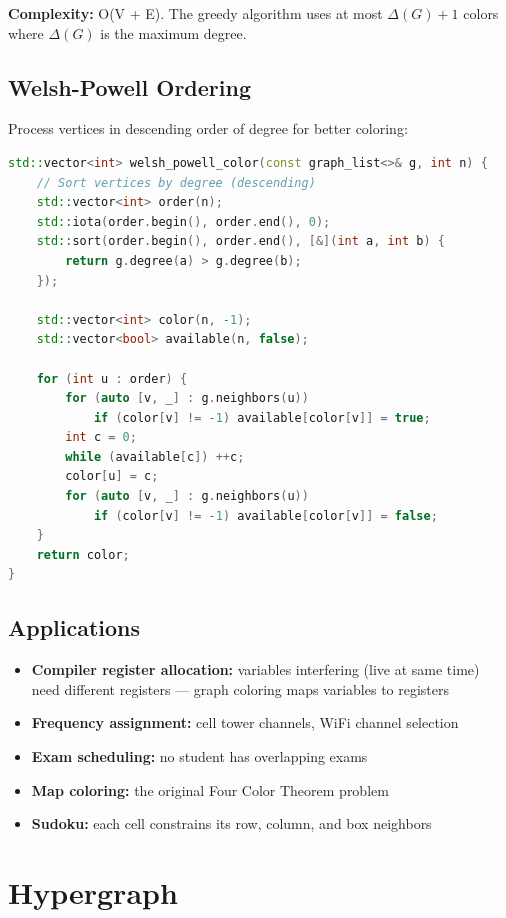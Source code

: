 \textbf{Complexity:} O(V + E). The greedy algorithm uses at most $\Delta(G) + 1$ colors where $\Delta(G)$ is the maximum degree.

\subsection{Welsh-Powell Ordering}

Process vertices in descending order of degree for better coloring:

\begin{lstlisting}[language=C++]
std::vector<int> welsh_powell_color(const graph_list<>& g, int n) {
    // Sort vertices by degree (descending)
    std::vector<int> order(n);
    std::iota(order.begin(), order.end(), 0);
    std::sort(order.begin(), order.end(), [&](int a, int b) {
        return g.degree(a) > g.degree(b);
    });

    std::vector<int> color(n, -1);
    std::vector<bool> available(n, false);

    for (int u : order) {
        for (auto [v, _] : g.neighbors(u))
            if (color[v] != -1) available[color[v]] = true;
        int c = 0;
        while (available[c]) ++c;
        color[u] = c;
        for (auto [v, _] : g.neighbors(u))
            if (color[v] != -1) available[color[v]] = false;
    }
    return color;
}
\end{lstlisting}

\subsection{Applications}

\begin{itemize}
\item \textbf{Compiler register allocation:} variables interfering (live at same time) need different registers — graph coloring maps variables to registers
\item \textbf{Frequency assignment:} cell tower channels, WiFi channel selection
\item \textbf{Exam scheduling:} no student has overlapping exams
\item \textbf{Map coloring:} the original Four Color Theorem problem
\item \textbf{Sudoku:} each cell constrains its row, column, and box neighbors
\end{itemize}

\section{Hypergraph}

